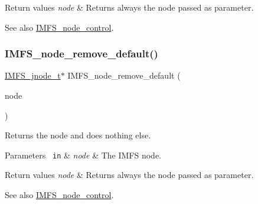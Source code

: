 \begin{DoxyRetVals}{Return values}
{\em node} & Returns always the node passed as parameter.\\
\hline
\end{DoxyRetVals}
\begin{DoxySeeAlso}{See also}
\mbox{\hyperlink{structIMFS__node__control}{I\+M\+F\+S\+\_\+node\+\_\+control}}. 
\end{DoxySeeAlso}
\mbox{\label{group__IMFSGenericNodes_gadea493725f5f86786783f83d3c8d23db}} 
\subsubsection{\texorpdfstring{IMFS\_node\_remove\_default()}{IMFS\_node\_remove\_default()}}
{\footnotesize\ttfamily \mbox{\hyperlink{structIMFS__jnode__tt}{I\+M\+F\+S\+\_\+jnode\+\_\+t}}$\ast$ I\+M\+F\+S\+\_\+node\+\_\+remove\+\_\+default (\begin{DoxyParamCaption}\item[{\mbox{\hyperlink{structIMFS__jnode__tt}{I\+M\+F\+S\+\_\+jnode\+\_\+t}} $\ast$}]{node }\end{DoxyParamCaption})}



Returns the node and does nothing else. 


\begin{DoxyParams}[1]{Parameters}
\mbox{\texttt{ in}}  & {\em node} & The I\+M\+FS node.\\
\hline
\end{DoxyParams}

\begin{DoxyRetVals}{Return values}
{\em node} & Returns always the node passed as parameter.\\
\hline
\end{DoxyRetVals}
\begin{DoxySeeAlso}{See also}
\mbox{\hyperlink{structIMFS__node__control}{I\+M\+F\+S\+\_\+node\+\_\+control}}. 
\end{DoxySeeAlso}
